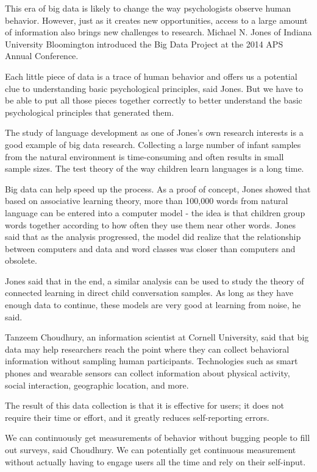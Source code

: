 This era of big data is likely to change the way psychologists observe 
human behavior. However, just as it creates new opportunities, access 
to a large amount of information also brings new challenges to research. 
Michael N. Jones of Indiana University Bloomington introduced the 
Big Data Project at the 2014 APS Annual Conference.

Each little piece of data is a trace of human behavior and offers 
us a potential clue to understanding basic psychological principles, 
said Jones. But we have to be able to put all those pieces together 
correctly to better understand the basic psychological principles 
that generated them\cite{editor01}.

The study of language development as one of Jones's own research interests 
is a good example of big data research. Collecting a large number of infant
samples from the natural environment is time-consuming and often results 
in small sample sizes. The test theory of the way children learn 
languages is a long time.

Big data can help speed up the process. As a proof of concept, Jones 
showed that based on associative learning theory, more than 100,000 
words from natural language can be entered into a computer model - the 
idea is that children group words together according to how often 
they use them near other words. Jones said that as the analysis progressed, 
the model did realize that the relationship between computers and data 
and word classes was closer than computers and obsolete.

Jones said that in the end, a similar analysis can be used to study the 
theory of connected learning in direct child conversation samples. As 
long as they have enough data to continue, these models are very good 
at learning from noise, he said\cite{editor01}.

Tanzeem Choudhury, an information scientist at Cornell University, 
said that big data may help researchers reach the point where they 
can collect behavioral information without sampling human participants. 
Technologies such as smart phones and wearable sensors can collect 
information about physical activity, social interaction, geographic 
location, and more.

The result of this data collection is that it is effective for users; 
it does not require their time or effort, and it greatly reduces 
self-reporting errors.

We can continuously get measurements of behavior without bugging 
people to fill out surveys, said Choudhury. We can potentially get 
continuous measurement without actually having to engage users all 
the time and rely on their self-input\cite{editor01}.

